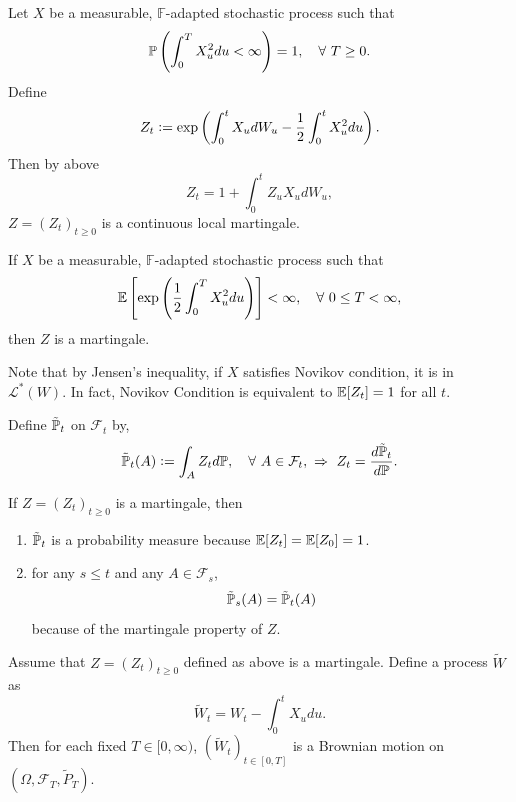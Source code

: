 \noindent Let $X$ be a measurable, $\mathbb{F}$-adapted stochastic process such that
\begin{equation*}
    \mathbb{P}\left(\int_0^T X_u^2 du < \infty\right) = 1,\quad \forall~T \geq 0.
\end{equation*}
Define
\begin{equation*}
    Z_t \vcentcolon= \exp\left(\int_0^tX_udW_u - \frac{1}{2}\int_0^tX_u^2du\right).
\end{equation*}
Then by above
\begin{equation*}
    Z_t = 1 + \int_0^tZ_uX_u dW_u,
\end{equation*}
$Z =(Z_t)_{t \geq 0}$ is a continuous local martingale.

\begin{prop}
    If $X$ be a measurable, $\mathbb{F}$-adapted stochastic process such that
    \begin{equation*}
        \mathbb{E}\left[\exp\left(\frac{1}{2} \int_0^T X_u^2 du\right)\right] < \infty,\quad \forall~ 0\leq T < \infty,
    \end{equation*}
    then $Z$ is a martingale.
\end{prop}
\begin{rmk}
    Note that by Jensen's inequality, if $X$ satisfies Novikov condition, it is in $\mathcal{L}^*(W)$. In fact, Novikov Condition is equivalent to $\mathbb{E}[Z_t] = 1$ for all $t$.
\end{rmk}

\noindent Define $\tilde{\mathbb{P}}_t$ on $\mathcal{F}_t$ by,
\begin{equation*}
    \tilde{\mathbb{P}}_t(A) \vcentcolon= \int_A Z_t d\mathbb{P},\quad \forall~ A \in \mathcal{F}_t,~\Rightarrow~ Z_t = \frac{d\tilde{\mathbb{P}}_t}{d\mathbb{P}}.
\end{equation*}
\begin{rmk}
    If $Z = (Z_t)_{t \geq 0}$ is a martingale, then
    \begin{enumerate}[label=(\roman*)]
        \item $\tilde{\mathbb{P}}_t$ is a probability measure because $\mathbb{E}[Z_t] = \mathbb{E}[Z_0] = 1$.
        \item for any $s \leq t$ and any $A \in \mathcal{F}_s$,
        \begin{equation*}
            \tilde{\mathbb{P}}_s(A) = \tilde{\mathbb{P}}_t(A)
        \end{equation*}
        because of the martingale property of $Z$.
    \end{enumerate}
\end{rmk}

\begin{thm}
    Assume that $Z=(Z_t)_{t \geq 0}$ defined as above is a martingale. Define a process $\tilde{W}$ as
    \begin{equation*}
        \tilde{W}_t = W_t - \int_0^t X_u du.
    \end{equation*}
    Then for each fixed $T \in [0,\infty)$, $(\tilde{W}_t)_{t \in [0,T]}$ is a Brownian motion on $(\Omega,\mathcal{F}_T, \tilde{P}_T)$.
\end{thm}

